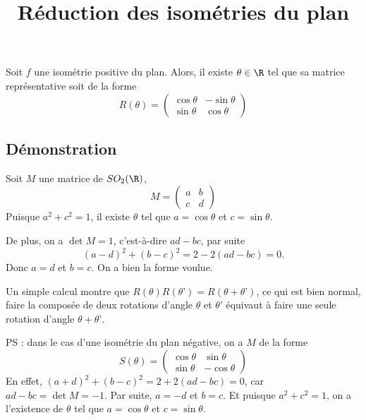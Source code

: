 \documentclass[fontsize=12pt,twoside=false,parskip=half, french]{scrartcl}
\title{Réduction des isométries du plan}
\date{}
\author{}
\begin{document}
\maketitle
   \begin{Theoreme}
      Soit $f$ une isométrie positive du plan. Alors, il existe $\theta \in \R$ 
      tel que sa matrice représentative soit de la forme
      \[
         R(\theta) = 
         \begin{pmatrix}
            \cos \theta & -\sin \theta \\
            \sin \theta & \cos \theta
         \end{pmatrix}
      \]
   \end{Theoreme}
   \subsection{Démonstration}
      Soit $M$ une matrice de $SO_2(\R)$, 
      \[
         M = 
         \begin{pmatrix}
            a & b \\
            c & d
         \end{pmatrix}
      \]
      Puisque $a^2 + c^2 = 1$, il existe $\theta$ tel que $a = \cos \theta$ et
      $c = \sin \theta$.
      
      De plus, on a $\det M = 1$, c’est-à-dire $ad - bc$, par suite
      \[
         (a - d)^2 + (b - c)^2 = 2 - 2(ad - bc) = 0.
      \]
      Donc $a = d$ et $b = c$. On a bien la forme voulue.
      
      Un simple calcul montre que $R(\theta)R(\theta’) = R(\theta + \theta’)$,
      ce qui est bien normal, faire la composée de deux rotations d’angle $\theta$ 
      et $\theta’$ équivaut à faire une seule rotation d’angle $\theta + \theta’$.
      
      PS : dans le cas d’une isométrie du plan négative, on a $M$ de la forme
      \[
         S(\theta) = 
         \begin{pmatrix}
            \cos \theta & \sin \theta \\
            \sin \theta & -\cos \theta
         \end{pmatrix}
      \]
      En effet, $(a + d)^2 + (b - c)^2 = 2 + 2(ad - bc) = 0$, car $ad - bc = \det M
      = -1$. Par suite, $a = -d$ et $b = c$. Et puisque $a^2 + c^2 = 1$, on a 
      l’existence de $\theta$ tel que $a = \cos \theta$ et $c = \sin \theta$.
\end{document}
